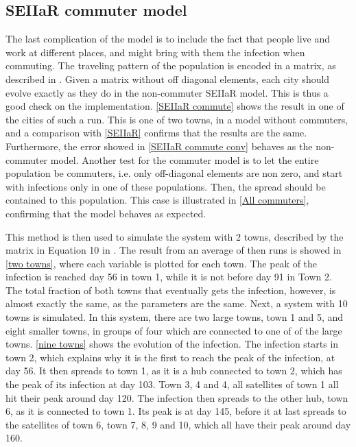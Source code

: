 \documentclass{article}
\begin{document}
    \subsection*{SEIIaR commuter model}
    The last complication of the model is to include the fact that people live and work at different places, and might bring with them the infection when commuting. 
    The traveling pattern of the population is encoded in a matrix, as described in \cite{exam}.
    Given a matrix without off diagonal elements, each city should evolve exactly as they do in the non-commuter SEIIaR model.
    This is thus a good check on the implementation.
    \autoref{SEIIaR commute} shows the result in one of the cities of such a run.
    This is one of two towns, in a model without commuters, and a comparison with \autoref{SEIIaR} confirms that the results are the same.
    Furthermore, the error showed in \autoref{SEIIaR commute conv} behaves as the non-commuter model.
    Another test for the commuter model is to let the entire population be commuters, i.e. only off-diagonal elements are non zero, and start with infections only in one of these populations.
    Then, the spread should be contained to this population.
    This case is illustrated in \autoref{All commuters}, confirming that the model behaves as expected.

    This method is then used to simulate the system with 2 towns, described by the matrix in Equation 10 in \cite{exam}.
    The result from an average of then runs is showed in \autoref{two towns}, where each variable is plotted for each town.
    The peak of the infection is reached day 56 in town 1, while it is not before day 91 in Town 2.
    The total fraction of both towns that eventually gets the infection, however, is almost exactly the same, as the parameters are the same.
    Next, a system with 10 towns is simulated. 
    In this system, there are two large towns, town 1 and 5, and eight smaller towns, in groups of four which are connected to one of of the large towns.
    \autoref{nine towns} shows the evolution of the infection.
    The infection starts in town 2, which explains why it is the first to reach the peak of the infection, at day 56.
    It then spreads to town 1, as it is a hub connected to town 2, which has the peak of its infection at day 103. 
    Town 3, 4 and 4, all satellites of town 1 all hit their peak around day 120.
    The infection then spreads to the other hub, town 6, as it is connected to town 1.
    Its peak is at day 145, before it at last spreads to the satellites of town 6, town 7, 8, 9 and 10, which all have their peak around day 160.
\end{document}
